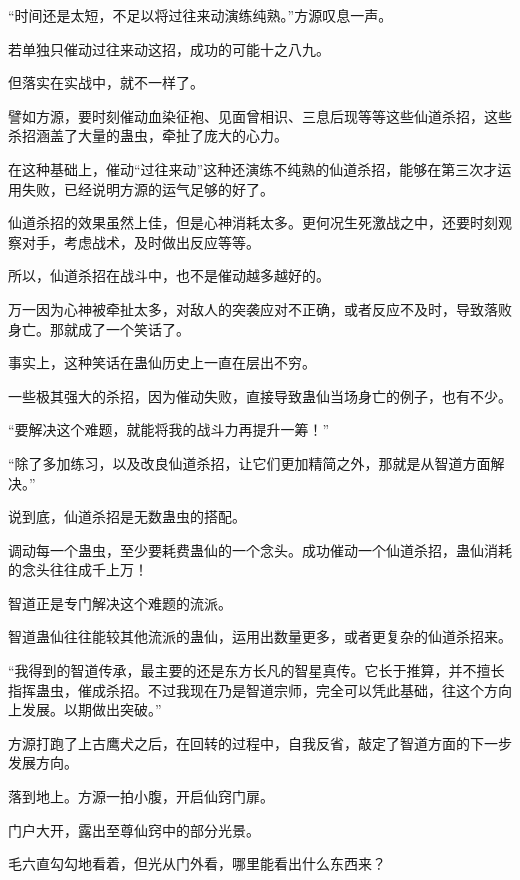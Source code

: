
\begin{this_body}



“时间还是太短，不足以将过往来动演练纯熟。”方源叹息一声。

若单独只催动过往来动这招，成功的可能十之八九。

但落实在实战中，就不一样了。

譬如方源，要时刻催动血染征袍、见面曾相识、三息后现等等这些仙道杀招，这些杀招涵盖了大量的蛊虫，牵扯了庞大的心力。

在这种基础上，催动“过往来动”这种还演练不纯熟的仙道杀招，能够在第三次才运用失败，已经说明方源的运气足够的好了。

仙道杀招的效果虽然上佳，但是心神消耗太多。更何况生死激战之中，还要时刻观察对手，考虑战术，及时做出反应等等。

所以，仙道杀招在战斗中，也不是催动越多越好的。

万一因为心神被牵扯太多，对敌人的突袭应对不正确，或者反应不及时，导致落败身亡。那就成了一个笑话了。

事实上，这种笑话在蛊仙历史上一直在层出不穷。

一些极其强大的杀招，因为催动失败，直接导致蛊仙当场身亡的例子，也有不少。

“要解决这个难题，就能将我的战斗力再提升一筹！”

“除了多加练习，以及改良仙道杀招，让它们更加精简之外，那就是从智道方面解决。”

说到底，仙道杀招是无数蛊虫的搭配。

调动每一个蛊虫，至少要耗费蛊仙的一个念头。成功催动一个仙道杀招，蛊仙消耗的念头往往成千上万！

智道正是专门解决这个难题的流派。

智道蛊仙往往能较其他流派的蛊仙，运用出数量更多，或者更复杂的仙道杀招来。

“我得到的智道传承，最主要的还是东方长凡的智星真传。它长于推算，并不擅长指挥蛊虫，催成杀招。不过我现在乃是智道宗师，完全可以凭此基础，往这个方向上发展。以期做出突破。”

方源打跑了上古鹰犬之后，在回转的过程中，自我反省，敲定了智道方面的下一步发展方向。

落到地上。方源一拍小腹，开启仙窍门扉。

门户大开，露出至尊仙窍中的部分光景。

毛六直勾勾地看着，但光从门外看，哪里能看出什么东西来？


\end{this_body}
